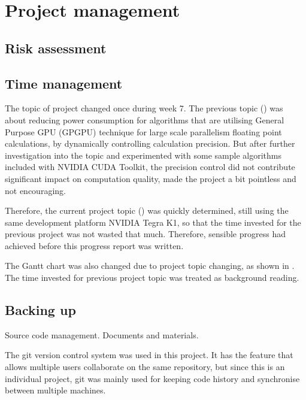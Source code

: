 \chapter{Project management}

\section{Risk assessment}

\section{Time management}

The topic of project changed once during week 7. The previous topic () was about reducing power consumption for algorithms that are utilising General Purpose GPU (GPGPU) technique for large scale parallelism floating point calculations, by dynamically controlling calculation precision. But after further investigation into the topic and experimented with some sample algorithms included with NVIDIA CUDA Toolkit, the precision control did not contribute significant impact on computation quality, made the project a bit pointless and not encouraging.

Therefore, the current project topic () was quickly determined, still using the same development platform NVIDIA Tegra K1, so that the time invested for the previous project was not wasted that much. Therefore, sensible progress had achieved before this progress report was written.

The Gantt chart was also changed due to project topic changing, as shown in . The time invested for previous project topic was treated as background reading.

\section{Backing up}

Source code management.
Documents and materials.

The git version control system \cite{git} was used in this project. It has the feature that allows multiple users collaborate on the same repository, but since this is an individual project, git was mainly used for keeping code history and synchronise between multiple machines.


